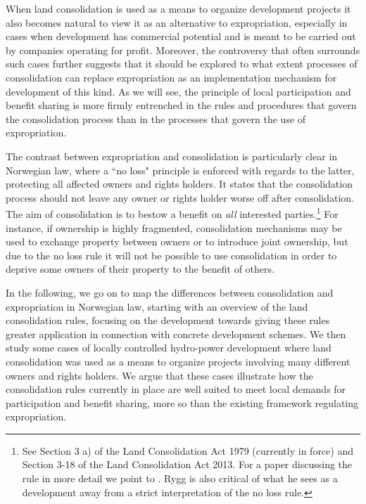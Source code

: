 When land consolidation is used as a means to organize development projects it also becomes natural to view it as an alternative to expropriation, especially in cases when development has commercial potential and is meant to be carried out by companies operating for profit. Moreover, the controversy that often surrounds such cases further suggests that it should be explored to what extent processes of consolidation can replace expropriation as an implementation mechanism for development of this kind. As we will see, the principle of local participation and benefit sharing is more firmly entrenched in the rules and procedures that govern the consolidation process than in the processes that govern the use of expropriation. 

The contrast between expropriation and consolidation is particularly clear in Norwegian law, where a ``no loss" principle is enforced with regards to the latter, protecting all affected owners and rights holders. It states that the consolidation process should not leave any owner or rights holder worse off after consolidation. The aim of consolidation is to bestow a benefit on \emph{all} interested parties.\footnote{See Section 3 a) of the Land Consolidation Act 1979 (currently in force) and Section 3-18 of the Land Consolidation Act 2013. For a paper discussing the rule in more detail we point to \cite{rygg1998}. Rygg is also critical of what he sees as a development away from a strict interpretation of the no loss rule.} For instance, if ownership is highly fragmented, consolidation mechanisms may be used to exchange property between owners or to introduce joint ownership, but due to the no loss rule it will not be possible to use consolidation in order to deprive some owners of their property to the benefit of others.

In the following, we go on to map the differences between consolidation and expropriation in Norwegian law, starting with an overview of the land consolidation rules, focusing on the development towards giving these rules greater application in connection with concrete development schemes. We then study some cases of locally controlled hydro-power development where land consolidation was used as a means to organize projects involving many different owners and rights holders. We argue that these cases illustrate how the consolidation rules currently in place are well suited to meet local demands for participation and benefit sharing, more so than the existing framework regulating expropriation.

